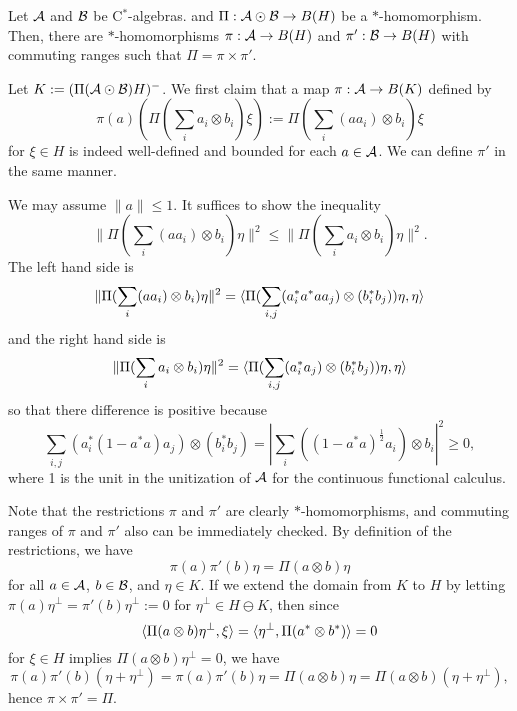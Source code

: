 \documentclass{../../small}
\begin{document}
\begin{lem}
Let $\mathcal{A}$ and $\mathcal{B}$ be C$^*$-algebras. and $\Pi:\mathcal{A}\odot\mathcal{B}\to B(H)$ be a $*$-homomorphism.
Then, there are $*$-homomorphisms $\pi:\mathcal{A}\to B(H)$ and $\pi':\mathcal{B}\to B(H)$ with commuting ranges such that $\Pi=\pi\times\pi'$.
\end{lem}
\begin{pf}
Let $K:=(\Pi(\mathcal{A}\odot\mathcal{B})H)^-$.
We first claim that a map $\pi:\mathcal{A}\to B(K)$ defined by
\[\pi(a)(\Pi(\sum_ia_i\otimes b_i)\xi):=\Pi(\sum_i(aa_i)\otimes b_i)\xi\]
for $\xi\in H$ is indeed well-defined and bounded for each $a\in\mathcal{A}$.
We can define $\pi'$ in the same manner.

We may assume $\|a\|\le1$.
It suffices to show the inequality
\[\|\Pi(\sum_i(aa_i)\otimes b_i)\eta\|^2\le\|\Pi(\sum_ia_i\otimes b_i)\eta\|^2.\]
The left hand side is
\[\|\Pi(\sum_i(aa_i)\otimes b_i)\eta\|^2
=\langle\Pi(\sum_{i,j}(a_i^*a^*aa_j)\otimes(b_i^*b_j))\eta,\eta\rangle\]
and the right hand side is
\[\|\Pi(\sum_ia_i\otimes b_i)\eta\|^2
=\langle\Pi(\sum_{i,j}(a_i^*a_j)\otimes(b_i^*b_j))\eta,\eta\rangle\]
so that there difference is positive because
\[\sum_{i,j}(a_i^*(1-a^*a)a_j)\otimes(b_i^*b_j)=|\sum_i((1-a^*a)^{\frac12}a_i)\otimes b_i|^2\ge0,\]
where 1 is the unit in the unitization of $\mathcal{A}$ for the continuous functional calculus.

Note that the restrictions $\pi$ and $\pi'$ are clearly $*$-homomorphisms, and commuting ranges of $\pi$ and $\pi'$ also can be immediately checked.
By definition of the restrictions, we have
\[\pi(a)\pi'(b)\eta=\Pi(a\otimes b)\eta\]
for all $a\in\mathcal{A}$, $b\in\mathcal{B}$, and $\eta\in K$.
If we extend the domain from $K$ to $H$ by letting $\pi(a)\eta^\perp=\pi'(b)\eta^\perp:=0$ for $\eta^\perp\in H\ominus K$, then since
\[\langle\Pi(a\otimes b)\eta^\perp,\xi\rangle=\langle\eta^\perp,\Pi(a^*\otimes b^*)\rangle=0\]
for $\xi\in H$ implies $\Pi(a\otimes b)\eta^\perp=0$, we have
\[\pi(a)\pi'(b)(\eta+\eta^\perp)=\pi(a)\pi'(b)\eta=\Pi(a\otimes b)\eta=\Pi(a\otimes b)(\eta+\eta^\perp),\]
hence $\pi\times\pi'=\Pi$.
\end{pf}
\end{document}
